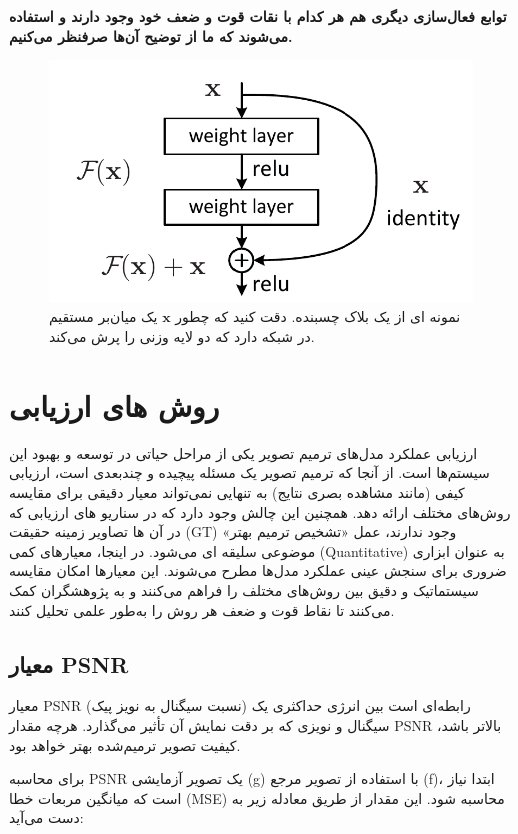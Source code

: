 \textbf{توابع فعال‌سازی دیگری هم هر کدام با نقات قوت و ضعف خود وجود دارند و استفاده می‌شوند که ما از توضیح آن‌ها صرفنظر می‌کنیم.}

\begin{figure}
	\centering
	\includegraphics[width=0.7\linewidth]{resb1}
	\caption{نمونه ای از یک بلاک چسبنده. دقت کنید که چطور $\mathbf{x}$ یک میان‌بر مستقیم در شبکه دارد که دو لایه وزنی را پرش می‌کند.}
	\label{fig:resb1}
\end{figure}



\section{روش های ارزیابی}

ارزیابی عملکرد مدل‌های ترمیم تصویر یکی از مراحل حیاتی در توسعه و بهبود این سیستم‌ها است. از آنجا که ترمیم تصویر یک مسئله پیچیده و چندبعدی است، ارزیابی کیفی (مانند مشاهده بصری نتایج) به تنهایی نمی‌تواند معیار دقیقی برای مقایسه روش‌های مختلف ارائه دهد. همچنین این چالش وجود دارد که در سناریو های ارزیابی که در آن ها تصاویر زمینه حقیقت (GT) وجود ندارند، عمل «تشخیص ترمیم بهتر» موضوعی سلیقه ای می‌شود. در اینجا، معیارهای کمی (Quantitative) به عنوان ابزاری ضروری برای سنجش عینی عملکرد مدل‌ها مطرح می‌شوند. این معیارها امکان مقایسه سیستماتیک و دقیق بین روش‌های مختلف را فراهم می‌کنند و به پژوهشگران کمک می‌کنند تا نقاط قوت و ضعف هر روش را به‌طور علمی تحلیل کنند.
\subsection{معیار PSNR}
معیار PSNR (نسبت سیگنال به نویز پیک) رابطه‌ای است بین انرژی حداکثری یک سیگنال و نویزی که بر دقت نمایش آن تأثیر می‌گذارد. هرچه مقدار PSNR بالاتر باشد، کیفیت تصویر ترمیم‌شده بهتر خواهد بود.

برای محاسبه PSNR یک تصویر آزمایشی (g) با استفاده از تصویر مرجع (f)، ابتدا نیاز است که میانگین مربعات خطا (MSE) محاسبه شود. این مقدار از طریق معادله زیر به دست می‌آید:

